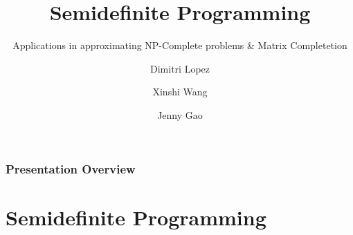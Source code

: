 \documentclass[
	11pt, %
]{beamer}
\title[Semidefinite Programming]{Semidefinite Programming} %
\subtitle{Applications in approximating NP-Complete problems \& Matrix Completetion} %
\author[]{Dimitri Lopez \and Xinshi Wang \and Jenny Gao} %
\institute[RPI]{Rensselaer Polytechnic Institute} %
\begin{document}

\begin{frame}
	\titlepage %
\end{frame}



\begin{frame}
	\frametitle{Presentation Overview} %
	
	\tableofcontents %
\end{frame}


\section{Semidefinite Programming}

\end{document}
